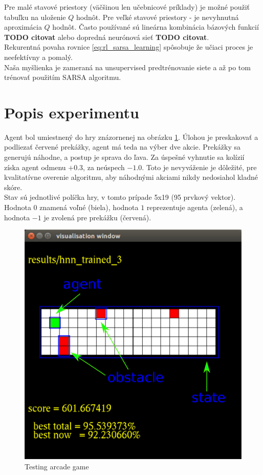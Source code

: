 \documentclass[10pt,a4paper]{article}
\begin{document}
Pre malé stavové priestory (väčšinou len učebnicové príklady) je možné použiť tabuľku na
uloženie $Q$ hodnôt.
Pre veľké stavové priestory - je nevyhnutná aproximácia $Q$ hodnôt.
Často používané sú lineárna kombinácia bázových funkcií {\bf TODO citovat}
alebo dopredná neurónová sieť {\bf TODO citovat}.
\\
Rekurentná povaha rovnice \ref{eq:rl_sarsa_learning} spôsobuje že učiaci proces je
neefektívny a pomalý.
\\
Naša myšlienka je zameraná na unsupervised predtrénovanie siete a až po tom
trénovať použitím SARSA algoritmu.

\newpage
\section{Popis experimentu}

Agent bol umiestnený do hry znázornenej na obrázku \ref{img:Testing arcade game}.
Úlohou je preskakovať a podliezať červené prekážky, agent má teda na výber dve akcie.
Prekážky sa generujú náhodne, a postup je sprava do ľava. Za úspešné vyhnutie sa kolízií
získa agent odmenu $+0.3$, za neúspech $-1.0$. Toto je nevyváženie je dôležité,
pre kvalitatívne overenie algoritmu, aby náhodnými akciami nikdy nedosiahol kladné
skóre.
\\
Stav sú jednotlivé políčka hry, v tomto prípade 5x19 (95 prvkový vektor).
Hodnota $0$ znamená voľné (biela), hodnota $1$ reprezentuje agenta (zelená),
a hodnota $-1$ je zvolená pre prekážku (červená).

\begin{figure}[!h]
  \centering
  \includegraphics[scale=0.4]{../../diagrams/arcade_rl_game_desc.png}
  \caption{Testing arcade game}
  \label{img:Testing arcade game}
\end{figure}
\end{document}
